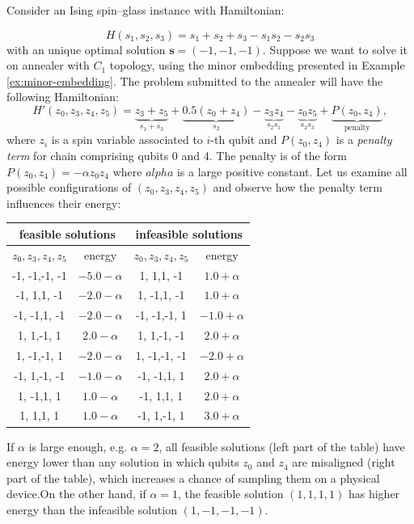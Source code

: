 \begin{example}
Consider an Ising spin--glass instance with Hamiltonian:

\begin{equation}
H(s_1, s_2, s_3) = s_1 + s_2 + s_3 - s_1s_2 - s_2s_3
\end{equation}
with an unique optimal solution $\mathbf{s} = (-1, -1, -1)$. Suppose we want to solve it on annealer
with $C_1$ topology, using the minor embedding presented in Example \ref{ex:minor-embedding}. The
problem submitted to the annealer will have the following Hamiltonian:
\begin{equation}
H'(z_0, z_3, z_4, z_5) = \underbrace{z_3 + z_5}_{s_1 + s_3} + \underbrace{0.5(z_0 + z_4)}_{s_2} - \underbrace{z_3z_4}_{s_2s_1} - \underbrace{z_0z_5}_{s_2s_3} + \underbrace{P(z_0, z_4)}_{\text{penalty}},
\end{equation}
where $z_i$ is a spin variable associated to $i$-th qubit and $P(z_0, z_4)$ is a \emph{penalty term}
for chain comprising qubits 0 and 4. The penalty is of the form $P(z_0, z_4) = -\alpha z_0z_4$ where
$alpha$ is a large positive constant. Let us examine all possible configurations of $(z_0, z_3, z_4,
z_5)$ and observe how the penalty term influences their energy:

\begin{center}
\begin{tabular}{|c|c|c|c|}
\hline
\multicolumn{2}{|c|}{feasible solutions} & \multicolumn{2}{c|}{infeasible solutions} \\
\hline
$z_0, z_3, z_4, z_5$ & energy & $z_0, z_3, z_4, z_5$ & energy\\
\hline
-1, -1,-1, -1 & $-5.0 -\alpha$ & 1, 1,1, -1 & $1.0 + \alpha$\\
-1, 1,1, -1 & $-2.0 -\alpha$ & 1, -1,1, -1 & $1.0 + \alpha$\\
-1, -1,1, -1 & $-2.0 -\alpha$ &-1, -1,-1, 1 & $-1.0 + \alpha$ \\
1, 1,-1, 1 & $2.0 -\alpha$ & 1, 1,-1, -1 & $2.0 + \alpha$ \\
1, -1,-1, 1 & $-2.0 -\alpha$ & 1, -1,-1, -1 & $-2.0 + \alpha$ \\
-1, 1,-1, -1 & $-1.0 -\alpha$ & -1, -1,1, 1 & $2.0 + \alpha$ \\
1, -1,1, 1 & $1.0 -\alpha$ & -1, 1,1, 1 & $2.0 + \alpha$\\
1, 1,1, 1 & $1.0  -\alpha$ & -1, 1,-1, 1 & $3.0 + \alpha$\\
\hline
\end{tabular}
\end{center}

If $\alpha$ is large enough, e.g. $\alpha=2$, all feasible solutions (left part of the table) have
energy lower than any solution in which qubits $z_0$ and $z_4$ are misaligned (right part of the
table), which increases a chance of sampling them on a physical device.On the other hand, if
$\alpha=1$, the feasible solution $(1,1,1,1)$ has higher energy than the infeasible solution $(1,
-1, -1, -1)$.
\end{example}

